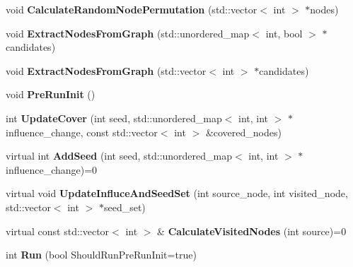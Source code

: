 \begin{DoxyCompactItemize}
\item 
\hypertarget{classall__distance__sketch_1_1TSkimBase_afd1a3b750c5132a449ea45355c04b1f2}{}void {\bfseries Calculate\+Random\+Node\+Permutation} (std\+::vector$<$ int $>$ $\ast$nodes)\label{classall__distance__sketch_1_1TSkimBase_afd1a3b750c5132a449ea45355c04b1f2}

\item 
\hypertarget{classall__distance__sketch_1_1TSkimBase_a6e0d5d59fe29bb04b3882ee0459d2889}{}void {\bfseries Extract\+Nodes\+From\+Graph} (std\+::unordered\+\_\+map$<$ int, bool $>$ $\ast$candidates)\label{classall__distance__sketch_1_1TSkimBase_a6e0d5d59fe29bb04b3882ee0459d2889}

\item 
\hypertarget{classall__distance__sketch_1_1TSkimBase_adf0a8900cc01ed5a8235f471307d1485}{}void {\bfseries Extract\+Nodes\+From\+Graph} (std\+::vector$<$ int $>$ $\ast$candidates)\label{classall__distance__sketch_1_1TSkimBase_adf0a8900cc01ed5a8235f471307d1485}

\item 
\hypertarget{classall__distance__sketch_1_1TSkimBase_a9396a79c42cae4977677d67901de2886}{}void {\bfseries Pre\+Run\+Init} ()\label{classall__distance__sketch_1_1TSkimBase_a9396a79c42cae4977677d67901de2886}

\item 
\hypertarget{classall__distance__sketch_1_1TSkimBase_a1d013a1e99a73d9bcffd0384455ea93b}{}int {\bfseries Update\+Cover} (int seed, std\+::unordered\+\_\+map$<$ int, int $>$ $\ast$influence\+\_\+change, const std\+::vector$<$ int $>$ \&covered\+\_\+nodes)\label{classall__distance__sketch_1_1TSkimBase_a1d013a1e99a73d9bcffd0384455ea93b}

\item 
\hypertarget{classall__distance__sketch_1_1TSkimBase_ae21117104d99b25935b20e26eb5c5af2}{}virtual int {\bfseries Add\+Seed} (int seed, std\+::unordered\+\_\+map$<$ int, int $>$ $\ast$influence\+\_\+change)=0\label{classall__distance__sketch_1_1TSkimBase_ae21117104d99b25935b20e26eb5c5af2}

\item 
\hypertarget{classall__distance__sketch_1_1TSkimBase_a0fc27a7ac6c598c37edf50b497ebaa99}{}virtual void {\bfseries Update\+Influce\+And\+Seed\+Set} (int source\+\_\+node, int visited\+\_\+node, std\+::vector$<$ int $>$ $\ast$seed\+\_\+set)\label{classall__distance__sketch_1_1TSkimBase_a0fc27a7ac6c598c37edf50b497ebaa99}

\item 
\hypertarget{classall__distance__sketch_1_1TSkimBase_a5e17ec1245203075b8163c2481ee922c}{}virtual const std\+::vector$<$ int $>$ \& {\bfseries Calculate\+Visited\+Nodes} (int source)=0\label{classall__distance__sketch_1_1TSkimBase_a5e17ec1245203075b8163c2481ee922c}

\item 
\hypertarget{classall__distance__sketch_1_1TSkimBase_ac317f707da7c5b52a2237c4048c246ee}{}int {\bfseries Run} (bool Should\+Run\+Pre\+Run\+Init=true)\label{classall__distance__sketch_1_1TSkimBase_ac317f707da7c5b52a2237c4048c246ee}

\end{DoxyCompactItemize}
